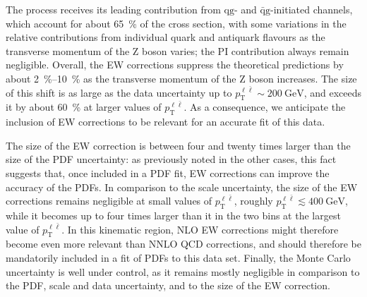 The process receives its leading contribution from $\mathrm{qg}$- and
$\bar{\mathrm{q}}\mathrm{g}$-initiated channels, which account for about \SI{65}{\percent}
of the cross section, with some variations in the relative contributions from
individual quark and antiquark flavours as the transverse momentum of the
Z boson varies; the PI contribution always remain negligible.
Overall, the EW corrections suppress the theoretical predictions by about
\SIrange{2}{10}{\percent} as the transverse momentum of the Z boson increases.
The size of this shift is as large as the data uncertainty up to
$p_{\mathrm{T}}^{\ell\bar\ell}\sim \SI{200}{\giga\electronvolt}$, and 
exceeds it by about \SI{60}{\percent} at larger values of
$p_\mathrm{T}^{\ell \bar{\ell}}$. As a consequence,
we anticipate the inclusion of EW corrections to be relevant for an accurate
fit of this data.

The size of the EW correction is between four and twenty times larger than the
size of the PDF uncertainty: as previously noted in the other cases, this fact
suggests that, once included in a PDF fit, EW corrections can improve the
accuracy of the PDFs. In comparison to the scale uncertainty, the size of the
EW corrections remains negligible at small values of $p_{\mathrm{T}}^{\ell\bar\ell}$,
roughly $p_{\mathrm{T}}^{\ell\bar\ell}\lesssim\SI{400}{\giga\electronvolt}$, while it
becomes up to four times larger than it in the two bins at the largest value of
$p_{\mathrm{T}}^{\ell\bar\ell}$. In this kinematic region, NLO EW corrections might
therefore become even more relevant than NNLO QCD corrections, and should
therefore be mandatorily included in a fit of PDFs to this data set.
Finally, the Monte Carlo uncertainty is well under control, as it remains
mostly negligible in comparison to the PDF, scale and data uncertainty, and to
the size of the EW correction.

